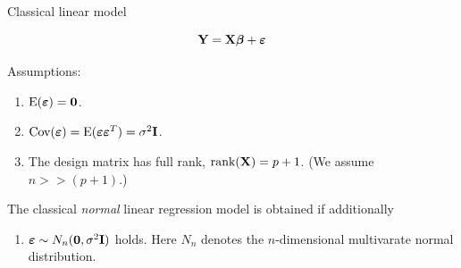 \documentclass[10pt,ignorenonframetext,]{beamer}
\providecommand{\tightlist}{%
  \setlength{\itemsep}{0pt}\setlength{\parskip}{0pt}}
\begin{document}
\begin{frame}

\begin{block}{Classical linear model}

\[{\bf Y=X \boldsymbol\beta}+{\boldsymbol \varepsilon}\]

Assumptions:

\begin{enumerate}
\def\labelenumi{\arabic{enumi}.}
\tightlist
\item
  \(\text{E}(\boldsymbol{\varepsilon})=\bf{0}\).
\item
  \(\text{Cov}(\boldsymbol{\varepsilon})=\text{E}(\boldsymbol{\varepsilon}\boldsymbol{\varepsilon}^T)=\sigma^2\bf{I}\).
\item
  The design matrix has full rank, \(\text{rank}({\bf X})=p+1\). (We
  assume \(n>>(p+1)\).)
\end{enumerate}

The classical \emph{normal} linear regression model is obtained if
additionally

\begin{enumerate}
\def\labelenumi{\arabic{enumi}.}
\setcounter{enumi}{3}
\tightlist
\item
  \(\boldsymbol\varepsilon\sim N_n({\bf 0},\sigma^2 {\bf I})\) holds.
  Here \(N_n\) denotes the \(n\)-dimensional multivarate normal
  distribution.
\end{enumerate}

\end{block}

\end{frame}
\end{document}
